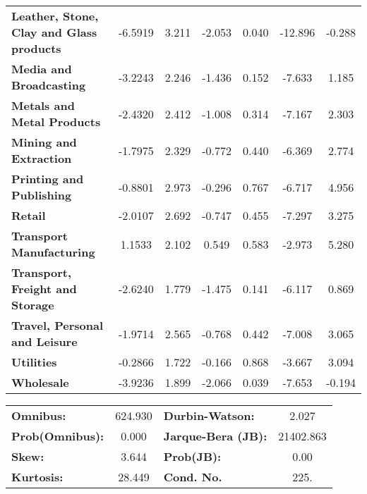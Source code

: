 \documentclass[ 11pt]{article}
\begin{document}
\begin{center}
\begin{tabular}{lcccccc}
\textbf{Leather, Stone, Clay and Glass products}       &      -6.5919  &        3.211     &    -2.053  &         0.040        &      -12.896    &       -0.288     \\
\textbf{Media and Broadcasting}                        &      -3.2243  &        2.246     &    -1.436  &         0.152        &       -7.633    &        1.185     \\
\textbf{Metals and Metal Products}                     &      -2.4320  &        2.412     &    -1.008  &         0.314        &       -7.167    &        2.303     \\
\textbf{Mining and Extraction}                         &      -1.7975  &        2.329     &    -0.772  &         0.440        &       -6.369    &        2.774     \\
\textbf{Printing and Publishing}                       &      -0.8801  &        2.973     &    -0.296  &         0.767        &       -6.717    &        4.956     \\
\textbf{Retail}                                        &      -2.0107  &        2.692     &    -0.747  &         0.455        &       -7.297    &        3.275     \\
\textbf{Transport Manufacturing}                       &       1.1533  &        2.102     &     0.549  &         0.583        &       -2.973    &        5.280     \\
\textbf{Transport, Freight and Storage}                &      -2.6240  &        1.779     &    -1.475  &         0.141        &       -6.117    &        0.869     \\
\textbf{Travel, Personal and Leisure}                  &      -1.9714  &        2.565     &    -0.768  &         0.442        &       -7.008    &        3.065     \\
\textbf{Utilities}                                     &      -0.2866  &        1.722     &    -0.166  &         0.868        &       -3.667    &        3.094     \\
\textbf{Wholesale}                                     &      -3.9236  &        1.899     &    -2.066  &         0.039        &       -7.653    &       -0.194     \\
\bottomrule
\end{tabular}
\begin{tabular}{lclc}
\textbf{Omnibus:}       & 624.930 & \textbf{  Durbin-Watson:     } &     2.027  \\
\textbf{Prob(Omnibus):} &   0.000 & \textbf{  Jarque-Bera (JB):  } & 21402.863  \\
\textbf{Skew:}          &   3.644 & \textbf{  Prob(JB):          } &      0.00  \\
\textbf{Kurtosis:}      &  28.449 & \textbf{  Cond. No.          } &      225.  \\
\bottomrule
\end{tabular}
\end{center}
\end{document}
